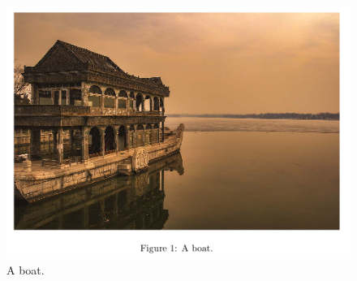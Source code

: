 \documentclass{article}
\begin{document}
\begin{figure}[h!]
    \includegraphics[width=\linewidth]{boat.jpg}
    \caption{A boat.}
    \label{fig:boat1}

\end{figure}
\end{document}
